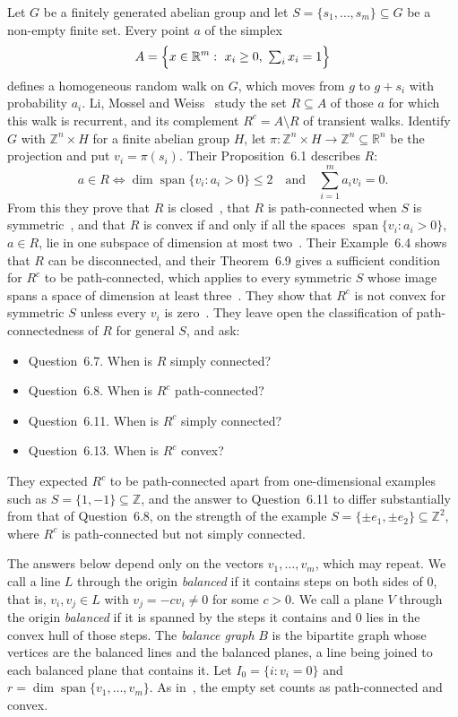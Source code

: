 \documentclass[11pt]{amsart}
\theoremstyle{remark}
\newcommand{\R}{\mathbb{R}}
\newcommand{\Z}{\mathbb{Z}}
\newcommand{\spn}{\operatorname{span}}
\begin{document}
Let $G$ be a finitely generated abelian group and let $S=\{s_1,\dots,s_m\}\subseteq G$ be a non-empty finite set.
Every point $a$ of the simplex
\[
A=\Bigl\{x\in\R^m:\ x_i\ge0,\ \textstyle\sum_i x_i=1\Bigr\}
\]
defines a homogeneous random walk on $G$, which moves from $g$ to $g+s_i$ with probability $a_i$. Li, Mossel and
Weiss~\cite[Section~6]{LMW} study the set $R\subseteq A$ of those $a$ for which this walk is recurrent, and its
complement $R^c=A\setminus R$ of transient walks. Identify $G$ with $\Z^n\times H$ for a finite abelian group $H$, let
$\pi:\Z^n\times H\to\Z^n\subseteq\R^n$ be the projection and put $v_i=\pi(s_i)$. Their Proposition~6.1 describes $R$:
\begin{equation}\label{eq:prop61}
a\in R\iff \dim\spn\{v_i:a_i>0\}\le2\quad\text{and}\quad \sum_{i=1}^m a_iv_i=0 .
\end{equation}
From this they prove that $R$ is closed~\cite[Theorem~6.2]{LMW}, that $R$ is path-connected when $S$ is
symmetric~\cite[Theorem~6.3]{LMW}, and that $R$ is convex if and only if all the spaces $\spn\{v_i:a_i>0\}$, $a\in R$,
lie in one subspace of dimension at most two~\cite[Theorem~6.5]{LMW}. Their Example~6.4 shows that $R$ can be
disconnected, and their Theorem~6.9 gives a sufficient condition for $R^c$ to be path-connected, which applies to every
symmetric $S$ whose image spans a space of dimension at least three~\cite[Corollary~6.10]{LMW}. They show that $R^c$
is not convex for symmetric $S$ unless every $v_i$ is zero~\cite[Proposition~6.12]{LMW}. They leave open the
classification of path-connectedness of $R$ for general $S$, and ask:
\begin{itemize}
\item[] Question~6.7. When is $R$ simply connected?
\item[] Question~6.8. When is $R^c$ path-connected?
\item[] Question~6.11. When is $R^c$ simply connected?
\item[] Question~6.13. When is $R^c$ convex?
\end{itemize}
They expected $R^c$ to be path-connected apart from one-dimensional examples such as $S=\{1,-1\}\subseteq\Z$, and the
answer to Question~6.11 to differ substantially from that of Question~6.8, on the strength of the example
$S=\{\pm e_1,\pm e_2\}\subseteq\Z^2$, where $R^c$ is path-connected but not simply connected.

The answers below depend only on the vectors $v_1,\dots,v_m$, which may repeat. We call a line $L$ through the origin
\emph{balanced} if it contains steps on both sides of $0$, that is, $v_i,v_j\in L$ with $v_j=-cv_i\ne0$ for some $c>0$.
We call a plane $V$ through the origin \emph{balanced} if it is spanned by the steps it contains and $0$ lies in the
convex hull of those steps. The \emph{balance graph} $B$ is the bipartite graph whose vertices are the balanced lines
and the balanced planes, a line being joined to each balanced plane that contains it. Let $I_0=\{i:v_i=0\}$ and
$r=\dim\spn\{v_1,\dots,v_m\}$. As in~\cite{LMW}, the empty set counts as path-connected and convex.
\end{document}
